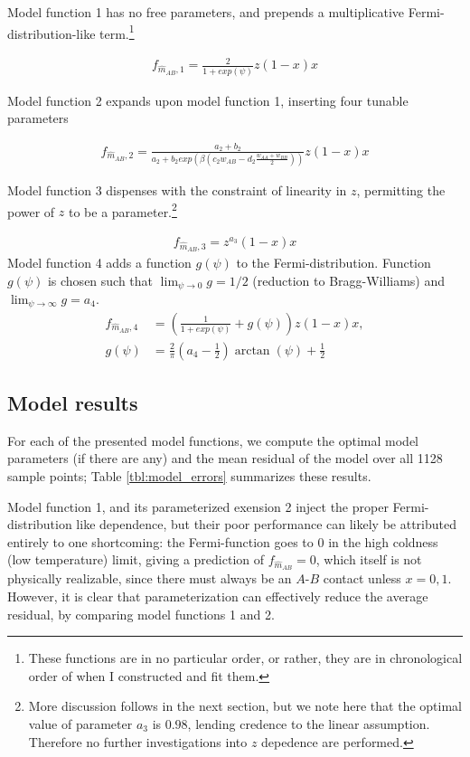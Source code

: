 \documentclass[10pt]{article}
\begin{document}
Model function 1 has no free parameters, and prepends a multiplicative Fermi-distribution-like term.\footnote{These functions are in no particular order, or rather, they are in chronological order of when I constructed and fit them.}

\begin{align}
    f_{\hat{m}_{AB},1} = 
    \frac{2}{1 + exp\left(\psi\right)}
    z (1-x) x
\end{align}

Model function 2 expands upon model function 1, inserting four tunable parameters

\begin{align}
    f_{\hat{m}_{AB},2} = 
    \frac{a_2+b_2}{a_2 + b_2 exp\left(\beta \left(c_2 w_{AB} - d_2 \frac{w_{AA} + w_{BB}}{2}\right) \right)}
    z (1-x) x
\end{align}

Model function 3 dispenses with the constraint of linearity in $z$, permitting the power of $z$ to be a parameter.\footnote{More discussion follows in the next section, but we note here that the optimal value of parameter $a_3$ is $0.98$, lending credence to the linear assumption.
Therefore no further investigations into $z$ depedence are performed.}

\begin{align}
    f_{\hat{m}_{AB},3} = z^{a_3} (1-x) x
\end{align}
Model function 4 adds a function $g(\psi)$ to the Fermi-distribution. Function $g(\psi)$ is chosen such that $\lim_{\psi \rightarrow 0} g = 1/2$ (reduction to Bragg-Williams) and $\lim_{\psi \rightarrow \infty} g = a_4$. \begin{align} f_{\hat{m}_{AB},4} &= \left( \frac{1}{1 + exp\left( \psi \right)} + g(\psi) \right) z (1-x) x, \\ g(\psi) &= \frac{2}{\pi} \left(a_4 - \frac{1}{2} \right) \arctan\left( \psi \right) + \frac{1}{2} \end{align}

\subsection{Model results}
For each of the presented model functions, we compute the optimal model parameters (if there are any) and the mean residual of the model over all 1128 sample points; Table \ref{tbl:model_errors} summarizes these results.

Model function 1, and its parameterized exension 2 inject the proper Fermi-distribution like dependence, but their poor performance can likely be attributed entirely to one shortcoming: the Fermi-function goes to $0$ in the high coldness (low temperature) limit, giving a prediction of $f_{\hat{m}_{AB}} = 0$, which itself is not physically realizable, since there must always be an $A$-$B$ contact unless $x=0,1$.
However, it is clear that parameterization can effectively reduce the average residual, by comparing model functions 1 and 2.
\end{document}
